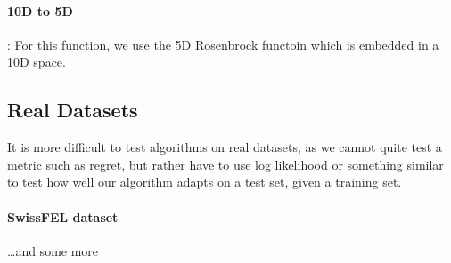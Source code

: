 \paragraph{10D to 5D}: For this function, we use the 5D Rosenbrock functoin which is embedded in a 10D space.

\subsection{Real Datasets}
It is more difficult to test algorithms on real datasets, as we cannot quite test a metric such as regret, but rather have to use log likelihood or something similar to test how well our algorithm adapts on a test set, given a training set.

\paragraph{SwissFEL dataset}
\dots and some more 


